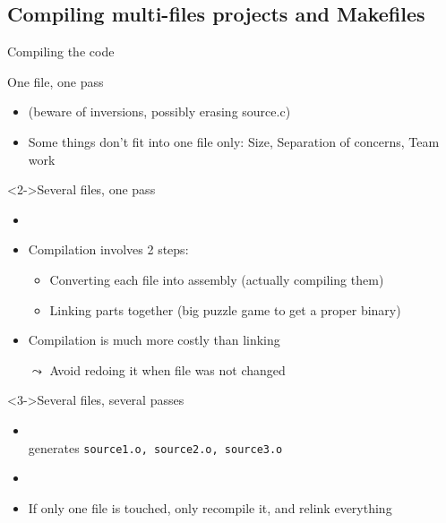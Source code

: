\subsection{Compiling multi-files projects and Makefiles}\subtoc
\begin{frame}{Compiling the code}
  \vspace{-.5\baselineskip}
  \begin{block}{One file, one pass}
    \begin{itemize}
    \item {} (beware of inversions,
      possibly erasing source.c)
    \item Some things don't fit into one file only:
      {\small Size, Separation of concerns, Team work}
    \end{itemize}
  \end{block}\vspace{-.5\baselineskip}

  \begin{block}<2->{Several files, one pass}
    \begin{itemize}
    \item {}
    \item Compilation involves 2 steps:
      \begin{itemize}
      \item Converting each file into assembly (actually compiling them)
      \item Linking parts together (big puzzle game to get a proper binary)
      \end{itemize}
    \item Compilation is much more costly than linking
    \item[$\leadsto$] Avoid redoing it when file was not changed
    \end{itemize}    
  \end{block}\vspace{-.5\baselineskip}

  \begin{block}<3->{Several files, several passes}
    \begin{itemize}
    \item {} 
      \\
      {\small generates \texttt{source1.o, source2.o, source3.o}}
    \item {} 
    \item If only one file is touched, only recompile it, and relink everything
    \end{itemize}
  \end{block}
\end{frame}
